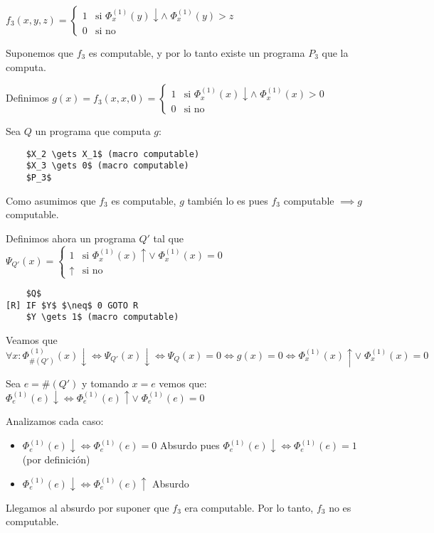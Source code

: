 $f_3(x, y, z) = \begin{cases}
    1 & \text{si } \Phi_x^{(1)}(y) \downarrow \land \; \Phi_x^{(1)}(y) > z \\
    0 & \text{si no}
\end{cases}$

Suponemos que $f_3$ es computable, y por lo tanto existe un programa $P_3$ que la computa.

Definimos $g(x) = f_3(x, x, 0) = \begin{cases}
    1 & \text{si } \Phi_x^{(1)}(x) \downarrow \land \; \Phi_x^{(1)}(x) > 0 \\
    0 & \text{si no}
\end{cases}$

Sea $Q$ un programa que computa $g$:

\begin{lstlisting}
    $X_2 \gets X_1$ (macro computable)
    $X_3 \gets 0$ (macro computable)
    $P_3$
\end{lstlisting}

Como asumimos que $f_3$ es computable, $g$ también lo es pues $f_3$ computable $\implies g$ computable.

Definimos ahora un programa $Q'$ tal que $\Psi_{Q'}(x) = \begin{cases}
    1 & \text{si } \Phi_x^{(1)}(x) \uparrow \lor \; \Phi_x^{(1)}(x) = 0 \\
    \uparrow & \text{si no}
\end{cases}$

\begin{lstlisting}
    $Q$
[R] IF $Y$ $\neq$ 0 GOTO R
    $Y \gets 1$ (macro computable)
\end{lstlisting}

Veamos que $\forall x: \Phi_{\#(Q')}^{(1)}(x) \downarrow \iff \Psi_{Q'}(x) \downarrow \iff \Psi_Q(x) = 0 \iff g(x) = 0 \iff \Phi_x^{(1)}(x) \uparrow \lor \; \Phi_x^{(1)}(x) = 0$

Sea $e = \#(Q')$ y tomando $x = e$ vemos que: $\Phi_e^{(1)}(e) \downarrow \iff \Phi_e^{(1)}(e) \uparrow \lor \; \Phi_e^{(1)}(e) = 0$

Analizamos cada caso:

\begin{itemize}
    \item $\Phi_e^{(1)}(e) \downarrow \iff \Phi_e^{(1)}(e) = 0$ Absurdo pues $\Phi_e^{(1)}(e) \downarrow \iff \Phi_e^{(1)}(e) = 1$ (por definición)
    \item $\Phi_e^{(1)}(e) \downarrow \iff \Phi_e^{(1)}(e) \uparrow$ Absurdo
\end{itemize}

Llegamos al absurdo por suponer que $f_3$ era computable. Por lo tanto, $f_3$ no es computable.
